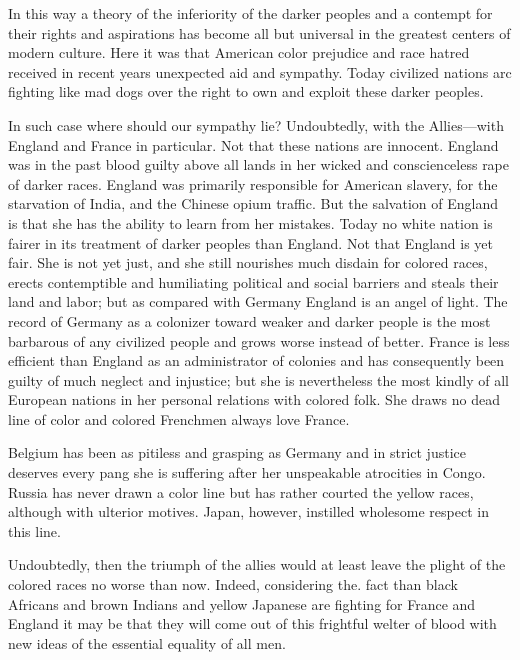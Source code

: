\documentclass[letterpaper,10pt,english]{jupyterBook}
\begin{document}
\sphinxAtStartPar
In this way a theory of the inferiority of the darker peoples and a contempt for their rights and aspirations has become all but universal in the greatest centers of modern culture. Here it was that American color prejudice and race hatred received in recent years unexpected aid and sympathy. To\sphinxhyphen{}day civilized nations arc fighting like mad dogs over the right to own and exploit these darker peoples.

\sphinxAtStartPar
In such case where should our sympathy lie? Undoubtedly, with the Allies—with England and France in particular. Not that these nations are innocent. England was in the past blood\sphinxhyphen{} guilty above all lands in her wicked and conscienceless rape of darker races. England was primarily responsible for American slavery, for the starvation of India, and the Chinese opium traffic. But the salvation of England is that she has the ability to learn from her mistakes. To\sphinxhyphen{}day no white nation is fairer in its treatment of darker peoples than England. Not that England is yet fair. She is not yet just, and she still nourishes much disdain for colored races, erects contemptible and humiliating political and social barriers and steals their land and labor; but as compared with Germany England is an angel of light. The record of Germany as a colonizer toward weaker and darker people is the most barbarous of any civilized people and grows worse instead of better. France is less efficient than England as an administrator of colonies and has consequently been guilty of much neglect and injustice; but she is nevertheless the most kindly of all European nations in her personal relations with colored folk. She draws no dead line of color and colored Frenchmen always love France.

\sphinxAtStartPar
Belgium has been as pitiless and grasping as Germany and in strict justice deserves every pang she is suffering after her unspeakable atrocities in Congo. Russia has never drawn a color line but has rather courted the yellow races, although with ulterior motives. Japan, however, instilled wholesome respect in this line.

\sphinxAtStartPar
Undoubtedly, then the triumph of the allies would at least leave the plight of the colored races no worse than now. Indeed, considering the. fact than black Africans and brown Indians and yellow Japanese are fighting for France and England it may be that they will come out of this frightful welter of blood with new ideas of the essential equality of all men.
\end{document}
